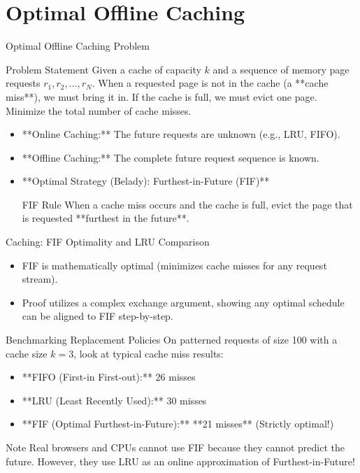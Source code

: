 \documentclass[aspectratio=169,xcolor=dvipsnames]{beamer}
\begin{document}
\section{Optimal Offline Caching}

\begin{frame}{Optimal Offline Caching Problem}
  \begin{block}{Problem Statement}
    Given a cache of capacity $k$ and a sequence of memory page requests $r_1, r_2, \ldots, r_N$.
    When a requested page is not in the cache (a **cache miss**), we must bring it in.
    If the cache is full, we must evict one page. Minimize the total number of cache misses.
  \end{block}
  \begin{itemize}
    \item **Online Caching:** The future requests are unknown (e.g., LRU, FIFO).
    \item **Offline Caching:** The complete future request sequence is known.
    \item **Optimal Strategy (Belady): Furthest-in-Future (FIF)**
      \begin{exampleblock}{FIF Rule}
        When a cache miss occurs and the cache is full, evict the page that is requested **furthest in the future**.
      \end{exampleblock}
  \end{itemize}
\end{frame}

\begin{frame}{Caching: FIF Optimality and LRU Comparison}
  \begin{itemize}
    \item FIF is mathematically optimal (minimizes cache misses for any request stream).
    \item Proof utilizes a complex exchange argument, showing any optimal schedule can be aligned to FIF step-by-step.
  \end{itemize}
  \begin{block}{Benchmarking Replacement Policies}
    On patterned requests of size 100 with a cache size $k=3$, look at typical cache miss results:
    \begin{itemize}
      \item **FIFO (First-in First-out):** 26 misses
      \item **LRU (Least Recently Used):** 30 misses
      \item **FIF (Optimal Furthest-in-Future):** **21 misses** (Strictly optimal!)
    \end{itemize}
  \end{block}
  \begin{exampleblock}{Note}
    Real browsers and CPUs cannot use FIF because they cannot predict the future. However, they use LRU as an online approximation of Furthest-in-Future!
  \end{exampleblock}
\end{frame}
\end{document}
